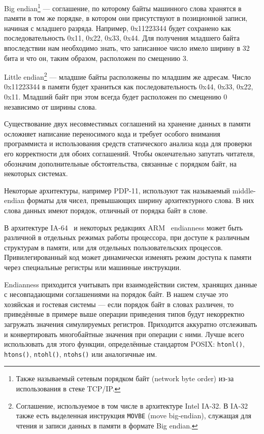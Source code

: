 \begin{enumerate*}
\item Big endian\footnote{Также называемый сетевым порядком байт (\abbr network byte order) из-за использования в стеке TCP/IP.} — соглашение, по которому байты машинного слова хранятся в памяти в том же порядке, в котором они присутствуют в позиционной записи, начиная с младшего разряда. Например, 0x11223344 будет сохранено как последовательность 0x11, 0x22, 0x33, 0x44. Для получения младшего байта впоследствии нам необходимо знать, что записанное число имело ширину в 32 бита и что он, таким образом, расположен по смещению 3.

\item Little endian\footnote{Соглашение, используемое в том числе в архитектуре Intel IA-32. В IA-32 также есть выделенная инструкция \texttt{MOVBE} (\abbr move big-endian), служащая для чтения и записи данных в памяти в формате Big endian.} — младшие байты расположены по младшим же адресам. Число 0x11223344 в памяти будет храниться как последовательность 0x44, 0x33, 0x22, 0x11. Младший байт при этом всегда будет расположен по смещению 0 независимо от ширины слова.
\end{enumerate*}

Существование двух несовместимых соглашений на хранение данных в памяти осложняет написание переносимого кода и требует особого внимания программиста и использования средств статического анализа кода для проверки его корректности для обоих соглашений. Чтобы окончательно запутать читателя, обозначим дополнительные обстоятельства, связанные с порядком байт, на некоторых системах.

\begin{itemize*}
    \item Некоторые архитектуры, например PDP-11, используют так называемый middle-endian форматы для чисел, превышающих ширину архитектурного слова. В них слова данных имеют порядок, отличный от порядка байт в слове.
    \item В архитектуре IA-64~\citep{itanium-sdm} и некоторых редакциях ARM~\citep{arm-sdg} endianness может быть различной в отдельных режимах работы процессора, при доступе к различным структурам в памяти, или для отдельных пользовательских процессов. Привилегированный код может динамически изменять режим доступа к памяти через специальные регистры или машинные инструкции.
\end{itemize*}

Endianness приходится учитывать при взаимодействии систем, хранящих данные с несовпадающими соглашениями на порядок байт. В нашем случае это хозяйская и гостевая системы — если порядок байт в словах различен, то приведённые в примере выше операции приведения типов будут некорректно загружать значения симулируемых регистров. Приходится аккуратно отслеживать и конвертировать многобайтные значения при операции с ними. Лучше всего использовать для этого функции, определённые стандартом POSIX: \texttt{htonl()}, \texttt{htons()}, \texttt{ntohl()}, \texttt{ntohs()} или аналогичные им.

